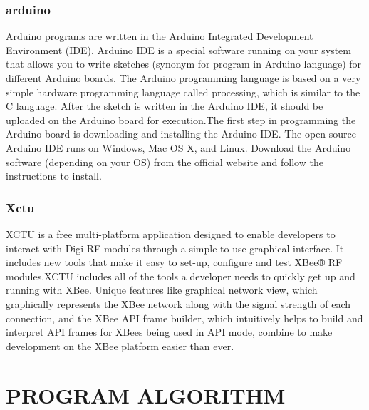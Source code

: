\documentclass[12pt,a4paper]{report}
\begin{document}
\subsection{arduino}
\hspace*{1cm} Arduino programs are written in the Arduino Integrated Development Environment (IDE). Arduino IDE is a special software running on your system that allows you to write sketches (synonym for program in Arduino language) for different Arduino boards. The Arduino programming language is based on a very simple hardware programming language called processing, which is similar to the C language. After the sketch is written in the Arduino IDE, it should be uploaded on the Arduino board for execution.The first step in programming the Arduino board is downloading and installing the Arduino IDE. The open source Arduino IDE runs on Windows, Mac OS X, and Linux. Download the Arduino software (depending on your OS) from the official website and follow the instructions to install.
\subsection{Xctu}
\hspace*{1cm}XCTU is a free multi-platform application designed to enable developers to interact with Digi RF modules through a simple-to-use graphical interface. It includes new tools that make it easy to set-up, configure and test XBee® RF modules.XCTU includes all of the tools a developer needs to quickly get up and running with XBee. Unique features like graphical network view, which graphically represents the XBee network along with the signal strength of each connection, and the XBee API frame builder, which intuitively helps to build and interpret API frames for XBees being used in API mode, combine to make development on the XBee platform easier than ever.
\chapter{PROGRAM ALGORITHM}
\end{document}
